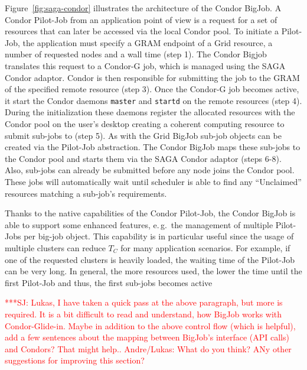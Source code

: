 \documentclass[conference,final]{IEEEtran}
\newcommand{\tc}{$T_{C}$ }
\newcommand{\jhanote}[1]{ {\textcolor{red} { ***SJ: #1 }}}
\newcommand{\jhanote}[1]{}
\begin{document}
Figure~\ref{fig:saga-condor} illustrates the architecture of the Condor BigJob.
A Condor Pilot-Job from an application point of view is a request 
for a set of resources that can later be accessed via the local Condor pool. 
To initiate a Pilot-Job, the application must specify a GRAM endpoint 
of a Grid resource, a number of requested nodes and a wall time (step 1). 
The Condor Bigjob translates this request to a Condor-G job, which is managed
using the SAGA Condor adaptor. Condor is then responsible for submitting 
the job to the GRAM of the specified remote resource (step 3). Once the Condor-G
job becomes active, it start the Condor daemons \texttt{master} and \texttt{startd} on 
the remote resources (step 4). During the initialization these 
daemons register the allocated resources with the Condor
pool on the user's desktop creating a coherent computing resource to
submit sub-jobs to (step 5). As with the Grid BigJob sub-job objects
can be created via the Pilot-Job abstraction. The Condor BigJob maps these
sub-jobs to the Condor pool and starts them via the SAGA Condor adaptor (steps 6-8). 
Also, sub-jobs can already be submitted before any node joins the
Condor pool. These jobs will automatically wait until scheduler is able to find any
``Unclaimed'' resources matching a sub-job's requirements. 

Thanks to the native capabilities of the Condor Pilot-Job, the Condor BigJob
is able to support some enhanced features, e.\,g.\ the management
of multiple Pilot-Jobs per big-job object. This capability is in particular
useful since the usage of multiple clusters can reduce \tc for many application
scenarios. For example, if one of the requested clusters is heavily loaded, the
waiting time of the Pilot-Job can be very long. In general, the more resources used, the 
lower the time until the first Pilot-Job and thus, the first sub-jobs becomes
active 


\jhanote{Lukas, I have taken a quick pass at the above paragraph, but
  more is required. It is a bit difficult to read and understand, how
  BigJob works with Condor-Glide-in. Maybe in addition to the above
  control flow (which is helpful), add a few sentences about the
  mapping between BigJob's interface (API calls) and Condors? That
  might help.. Andre/Lukas: What do you think? ANy other suggestions
  for improving this section?}
\end{document}

